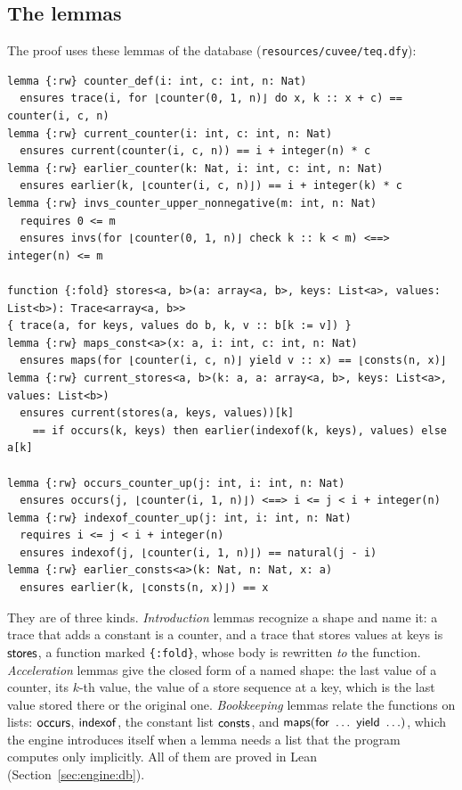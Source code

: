 \subsection{The lemmas}
The proof uses these lemmas of the database (\texttt{resources/cuvee/teq.dfy}):
\begin{lstlisting}
lemma {:rw} counter_def(i: int, c: int, n: Nat)
  ensures trace(i, for ⌊counter(0, 1, n)⌋ do x, k :: x + c) == counter(i, c, n)
lemma {:rw} current_counter(i: int, c: int, n: Nat)
  ensures current(counter(i, c, n)) == i + integer(n) * c
lemma {:rw} earlier_counter(k: Nat, i: int, c: int, n: Nat)
  ensures earlier(k, ⌊counter(i, c, n)⌋) == i + integer(k) * c
lemma {:rw} invs_counter_upper_nonnegative(m: int, n: Nat)
  requires 0 <= m
  ensures invs(for ⌊counter(0, 1, n)⌋ check k :: k < m) <==> integer(n) <= m

function {:fold} stores<a, b>(a: array<a, b>, keys: List<a>, values: List<b>): Trace<array<a, b>>
{ trace(a, for keys, values do b, k, v :: b[k := v]) }
lemma {:rw} maps_const<a>(x: a, i: int, c: int, n: Nat)
  ensures maps(for ⌊counter(i, c, n)⌋ yield v :: x) == ⌊consts(n, x)⌋
lemma {:rw} current_stores<a, b>(k: a, a: array<a, b>, keys: List<a>, values: List<b>)
  ensures current(stores(a, keys, values))[k]
    == if occurs(k, keys) then earlier(indexof(k, keys), values) else a[k]

lemma {:rw} occurs_counter_up(j: int, i: int, n: Nat)
  ensures occurs(j, ⌊counter(i, 1, n)⌋) <==> i <= j < i + integer(n)
lemma {:rw} indexof_counter_up(j: int, i: int, n: Nat)
  requires i <= j < i + integer(n)
  ensures indexof(j, ⌊counter(i, 1, n)⌋) == natural(j - i)
lemma {:rw} earlier_consts<a>(k: Nat, n: Nat, x: a)
  ensures earlier(k, ⌊consts(n, x)⌋) == x
\end{lstlisting}
They are of three kinds. \emph{Introduction} lemmas recognize a shape and name it: a trace that adds a constant
is a counter, and a trace that stores values at keys is $\mathsf{stores}$, a function marked \texttt{\{:fold\}}, whose body
is rewritten \emph{to} the function. \emph{Acceleration} lemmas give the closed form of a named shape: the last
value of a counter, its $k$-th value, the value of a store sequence at a key, which is the last value stored there
or the original one. \emph{Bookkeeping} lemmas relate the functions on lists: $\mathsf{occurs}$, $\mathsf{indexof}$, the constant list
$\mathsf{consts}$, and $\mathsf{maps}(\mathsf{for}\ \ldots\ \mathsf{yield}\ \ldots)$, which the engine introduces itself when a lemma needs a list that the
program computes only implicitly. All of them are proved in Lean (Section~\ref{sec:engine:db}).

